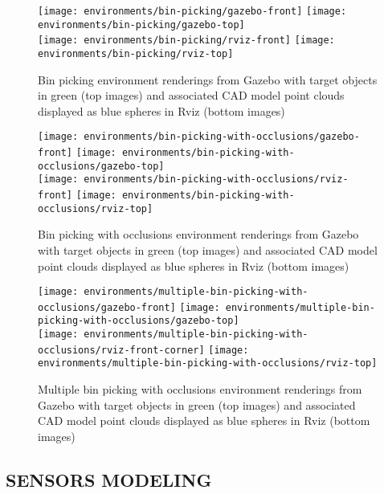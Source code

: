 \begin{figure}
	\centering
	\texttt{[image: environments/bin-picking/gazebo-front]}
	\texttt{[image: environments/bin-picking/gazebo-top]}\\
	\texttt{[image: environments/bin-picking/rviz-front]}
	\texttt{[image: environments/bin-picking/rviz-top]}
	\caption{Bin picking environment renderings from Gazebo with target objects in green (top images) and associated CAD model point clouds displayed as blue spheres in Rviz (bottom images)}
	\label{fig:bin-picking-environment}
\end{figure}

\begin{figure}
	\centering
	\texttt{[image: environments/bin-picking-with-occlusions/gazebo-front]}
	\texttt{[image: environments/bin-picking-with-occlusions/gazebo-top]}\\
	\texttt{[image: environments/bin-picking-with-occlusions/rviz-front]}
	\texttt{[image: environments/bin-picking-with-occlusions/rviz-top]}
	\caption{Bin picking with occlusions environment renderings from Gazebo with target objects in green (top images) and associated CAD model point clouds displayed as blue spheres in Rviz (bottom images)}
	\label{fig:bin-picking-with-occlusions-environment}
\end{figure}

\begin{figure}
	\centering
	\texttt{[image: environments/multiple-bin-picking-with-occlusions/gazebo-front]}
	\texttt{[image: environments/multiple-bin-picking-with-occlusions/gazebo-top]}\\
	\texttt{[image: environments/multiple-bin-picking-with-occlusions/rviz-front-corner]}
	\texttt{[image: environments/multiple-bin-picking-with-occlusions/rviz-top]}
	\caption{Multiple bin picking with occlusions environment renderings from Gazebo with target objects in green (top images) and associated CAD model point clouds displayed as blue spheres in Rviz (bottom images)}
	\label{fig:multiple-bin-picking-with-occlusions-environment}
\end{figure}


\subsection{\uppercase{Sensors modeling}}

